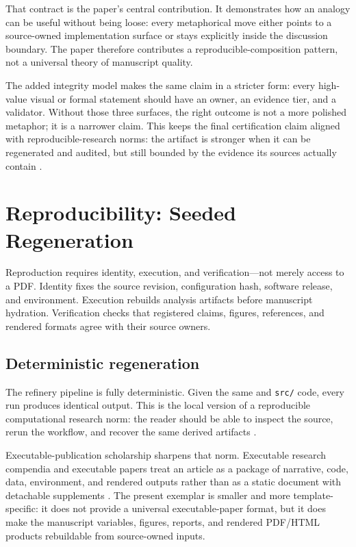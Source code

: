 \documentclass[
  english,
]{article}
\begin{document}
That contract is the paper's central contribution. It demonstrates how
an analogy can be useful without being loose: every metaphorical move
either points to a source-owned implementation surface or stays
explicitly inside the discussion boundary. The paper therefore
contributes a reproducible-composition pattern, not a universal theory
of manuscript quality.

The added integrity model makes the same claim in a stricter form: every
high-value visual or formal statement should have an owner, an evidence
tier, and a validator. Without those three surfaces, the right outcome
is not a more polished metaphor; it is a narrower claim. This keeps the
final certification claim aligned with reproducible-research norms: the
artifact is stronger when it can be regenerated and audited, but still
bounded by the evidence its sources actually contain
\citep{sandve2013ten, marwick2018packaging}.

\newpage

\section{Reproducibility: Seeded
Regeneration}\label{sec:reproducibility}

Reproduction requires identity, execution, and verification---not merely
access to a PDF. Identity fixes the source revision, configuration hash,
software release, and environment. Execution rebuilds analysis artifacts
before manuscript hydration. Verification checks that registered claims,
figures, references, and rendered formats agree with their source
owners.

\subsection{Deterministic
regeneration}\label{deterministic-regeneration}

The refinery pipeline is fully deterministic. Given the same
 and \texttt{src/} code, every run
produces identical output. This is the local version of a reproducible
computational research norm: the reader should be able to inspect the
source, rerun the workflow, and recover the same derived artifacts
\citep{peng2011reproducible, sandve2013ten}.

Executable-publication scholarship sharpens that norm. Executable
research compendia and executable papers treat an article as a package
of narrative, code, data, environment, and rendered outputs rather than
as a static document with detachable supplements
\citep{nuest2017erc, lasser2020executable}. The present exemplar is
smaller and more template-specific: it does not provide a universal
executable-paper format, but it does make the manuscript variables,
figures, reports, and rendered PDF/HTML products rebuildable from
source-owned inputs.
\end{document}
